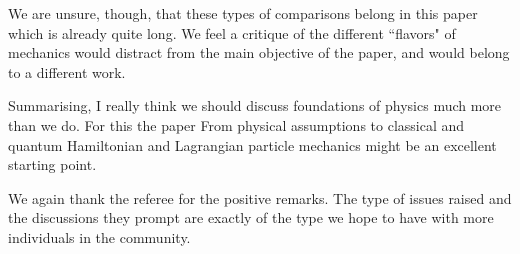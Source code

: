 \documentclass[10pt]{article}
\begin{document}
We are unsure, though, that these types of comparisons belong in this paper which is already quite long. We feel a critique of the different ``flavors" of mechanics would distract from the main objective of the paper, and would belong to a different work.

\begin{response}{Summarising, I really think we should discuss foundations of physics much more than
		we do. For this the paper From physical assumptions to classical and quantum Hamiltonian
		and Lagrangian particle mechanics might be an excellent starting point.}
\end{response}

We again thank the referee for the positive remarks. The type of issues raised and the discussions they prompt are exactly of the type we hope to have with more individuals in the community.
\end{document}
